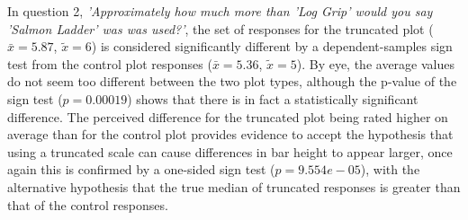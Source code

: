 \documentclass[
]{article}
\newenvironment{Shaded}{\begin{snugshade}}{\end{snugshade}}
\newcommand{\DecValTok}[1]{\textcolor[rgb]{0.00,0.00,0.81}{#1}}
\newcommand{\KeywordTok}[1]{\textcolor[rgb]{0.13,0.29,0.53}{\textbf{#1}}}
\newcommand{\NormalTok}[1]{#1}
\newcommand{\OperatorTok}[1]{\textcolor[rgb]{0.81,0.36,0.00}{\textbf{#1}}}
\newcommand{\StringTok}[1]{\textcolor[rgb]{0.31,0.60,0.02}{#1}}
\begin{document}
In question 2,
\textit{'Approximately how much more than 'Log Grip' would you say 'Salmon Ladder' was was used?'},
the set of responses for the truncated plot (\(\bar{x} = 5.87\),
\(\tilde{x} = 6\)) is considered significantly different by a
dependent-samples sign test from the control plot responses
(\(\bar{x} = 5.36\), \(\tilde{x} = 5\)). By eye, the average values do
not seem too different between the two plot types, although the p-value
of the sign test (\(p = 0.00019\)) shows that there is in fact a
statistically significant difference. The perceived difference for the
truncated plot being rated higher on average than for the control plot
provides evidence to accept the hypothesis that using a truncated scale
can cause differences in bar height to appear larger, once again this is
confirmed by a one-sided sign test (\(p=9.554e-05\)), with the
alternative hypothesis that the true median of truncated responses is
greater than that of the control responses.

\begin{Shaded}
\end{Shaded}
\end{document}

